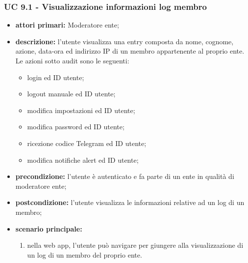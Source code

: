 		\subsubsection{UC 9.1 - Visualizzazione informazioni log membro}
			\begin{itemize}
			\item \textbf{attori primari:} Moderatore ente;
			\item \textbf{descrizione:} l'utente visualizza una entry composta da nome, cognome, azione, data-ora ed indirizzo IP di un membro appartenente al proprio ente. Le azioni sotto audit sono le seguenti: 
			
			\begin{itemize}
				\item login ed ID utente;
				\item logout manuale ed ID utente;
				\item modifica impostazioni ed ID utente;
				\item modifica password ed ID utente;
				\item ricezione codice Telegram ed ID utente;
				\item modifica notifiche alert ed ID utente;
			\end{itemize}
			
			\item \textbf{precondizione:} l'utente è autenticato e fa parte di un ente in qualità di moderatore ente;
			\item \textbf{postcondizione:} l'utente visualizza le informazioni relative ad un log di un membro;
			\item \textbf{scenario principale:}
			\begin{enumerate}
				\item nella web app, l'utente può navigare per giungere alla visualizzazione di un log di un membro del proprio ente.
			\end{enumerate}	
		\end{itemize}

		



		



		


